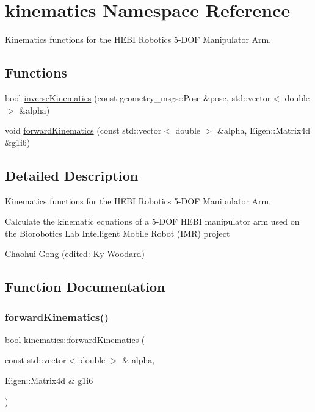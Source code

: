 \hypertarget{namespacekinematics}{}\section{kinematics Namespace Reference}
\label{namespacekinematics}


Kinematics functions for the H\+E\+BI Robotics 5-\/\+D\+OF Manipulator Arm.  


\subsection*{Functions}
\begin{DoxyCompactItemize}
\item 
bool \hyperlink{namespacekinematics_a5a3e9ea9b4ee18137b3c909038cf57c3}{inverse\+Kinematics} (const geometry\+\_\+msgs\+::\+Pose \&pose, std\+::vector$<$ double $>$ \&alpha)
\item 
void \hyperlink{namespacekinematics_a86c140821059c3c30f2b8051f381cdd3}{forward\+Kinematics} (const std\+::vector$<$ double $>$ \&alpha, Eigen\+::\+Matrix4d \&g1i6)
\end{DoxyCompactItemize}


\subsection{Detailed Description}
Kinematics functions for the H\+E\+BI Robotics 5-\/\+D\+OF Manipulator Arm. 

Calculate the kinematic equations of a 5-\/\+D\+OF H\+E\+BI manipulator arm used on the Biorobotics Lab Intelligent Mobile Robot (I\+MR) project

Chaohui Gong (edited\+: Ky Woodard) 

\subsection{Function Documentation}
\mbox{\label{namespacekinematics_a86c140821059c3c30f2b8051f381cdd3}} 
\subsubsection{\texorpdfstring{forward\+Kinematics()}{forwardKinematics()}}
{\footnotesize\ttfamily bool kinematics\+::forward\+Kinematics (\begin{DoxyParamCaption}\item[{const std\+::vector$<$ double $>$ \&}]{alpha,  }\item[{Eigen\+::\+Matrix4d \&}]{g1i6 }\end{DoxyParamCaption})}

